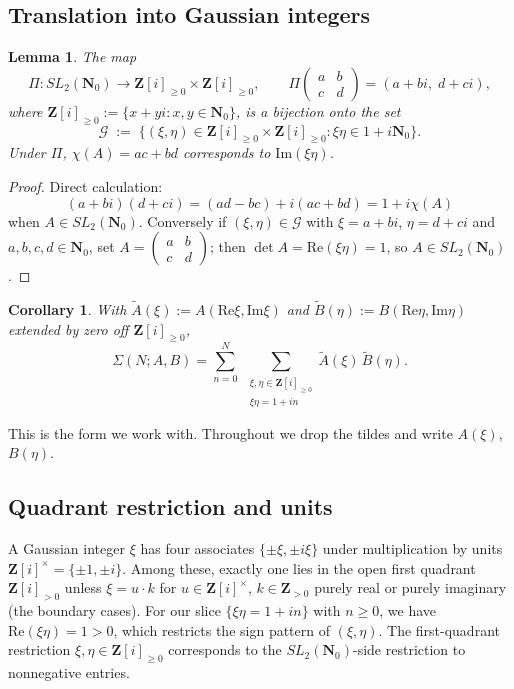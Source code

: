 \documentclass[11pt]{article}
\newtheorem{lemma}[theorem]{Lemma}
\newtheorem{corollary}[theorem]{Corollary}
\theoremstyle{definition}
\newcommand{\Nz}{\mathbf{N}_0}
\newcommand{\Z}{\mathbf{Z}}
\newcommand{\Zi}{\Z[i]}
\newcommand{\SLNz}{SL_2(\Nz)}
\newcommand{\Re}{\mathrm{Re}}
\newcommand{\Im}{\mathrm{Im}}
\renewcommand{\Re}{\mathrm{Re}}
\renewcommand{\Im}{\mathrm{Im}}
\begin{document}
\subsection{Translation into Gaussian integers}

\begin{lemma}\label{lem:gaussian-bijection}
The map
\[
\Pi:\SLNz\to\Zi_{\ge 0}\times\Zi_{\ge 0},\qquad
\Pi\begin{pmatrix}a&b\\c&d\end{pmatrix}=(a+bi,\;d+ci),
\]
where $\Zi_{\ge 0}:=\{x+yi:x,y\in\Nz\}$, is a bijection onto the set
\[
\mathcal{G}\;:=\;\{(\xi,\eta)\in\Zi_{\ge 0}\times\Zi_{\ge 0}:\xi\eta\in 1+i\Nz\}.
\]
Under $\Pi$, $\chi(A)=ac+bd$ corresponds to $\Im(\xi\eta)$.
\end{lemma}

\begin{proof}
Direct calculation:
\[
(a+bi)(d+ci)=(ad-bc)+i(ac+bd)=1+i\chi(A)
\]
when $A\in\SLNz$. Conversely if $(\xi,\eta)\in\mathcal{G}$ with $\xi=a+bi$, $\eta=d+ci$ and $a,b,c,d\in\Nz$, set $A=\begin{pmatrix}a&b\\c&d\end{pmatrix}$; then $\det A=\Re(\xi\eta)=1$, so $A\in\SLNz$.
\end{proof}

\begin{corollary}\label{cor:bilinear-as-divisor-sum}
With $\widetilde A(\xi):=A(\Re\xi,\Im\xi)$ and $\widetilde B(\eta):=B(\Re\eta,\Im\eta)$ extended by zero off $\Zi_{\ge 0}$,
\[
\Sigma(N;A,B)=\sum_{n=0}^N\;\sum_{\substack{\xi,\eta\in\Zi_{\ge 0}\\ \xi\eta=1+in}}\widetilde A(\xi)\,\widetilde B(\eta).
\]
\end{corollary}

This is the form we work with. Throughout we drop the tildes and write $A(\xi)$, $B(\eta)$.

\subsection{Quadrant restriction and units}

A Gaussian integer $\xi$ has four associates $\{\pm\xi,\pm i\xi\}$ under multiplication by units $\Zi^\times=\{\pm 1,\pm i\}$. Among these, exactly one lies in the open first quadrant $\Zi_{>0}$ unless $\xi=u\cdot k$ for $u\in\Zi^\times$, $k\in\Z_{>0}$ purely real or purely imaginary (the boundary cases). For our slice $\{\xi\eta=1+in\}$ with $n\ge 0$, we have $\Re(\xi\eta)=1>0$, which restricts the sign pattern of $(\xi,\eta)$. The first-quadrant restriction $\xi,\eta\in\Zi_{\ge 0}$ corresponds to the $\SLNz$-side restriction to nonnegative entries.
\end{document}
